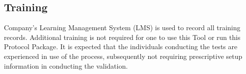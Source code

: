 \subsection{Training}
Company's Learning Management System (LMS) is used to record all training records.
Additional training is not required for one to use this Tool or run this
Protocol Package.  It is expected that the individuals conducting the tests are
experienced in use of the process, subsequently not requiring prescriptive setup
information in conducting the validation.

